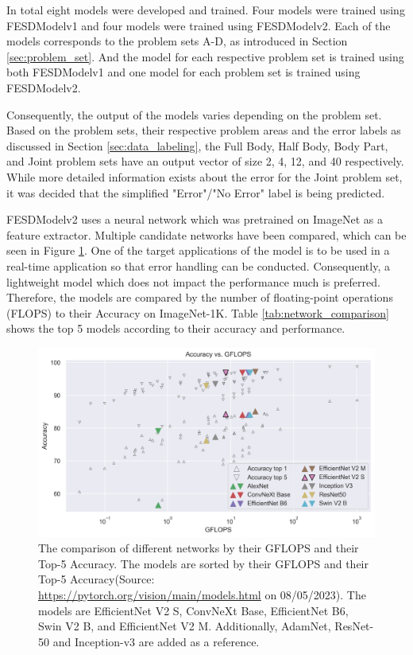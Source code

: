 In total eight models were developed and trained. Four models were trained using FESDModelv1 and four models were trained using FESDModelv2. Each of the models corresponds to the problem sets A-D, as introduced in Section \ref{sec:problem_set}. And the model for each respective problem set is trained using both FESDModelv1 and one model for each problem set is trained using FESDModelv2.

Consequently, the output of the models varies depending on the problem set. Based on the problem sets, their respective problem areas and the error labels as discussed in Section \ref{sec:data_labeling}, the Full Body, Half Body, Body Part, and Joint problem sets have an output vector of size 2, 4, 12, and 40 respectively. While more detailed information exists about the error for the Joint problem set, it was decided that the simplified "Error"/"No Error" label is being predicted.

FESDModelv2 uses a neural network which was pretrained on ImageNet as a feature extractor. Multiple candidate networks have been compared, which can be seen in Figure \ref{fig:network_comparison}. One of the target applications of the model is to be used in a real-time application so that error handling can be conducted. Consequently, a lightweight model which does not impact the performance much is preferred. Therefore, the models are compared by the number of floating-point operations (FLOPS) to their Accuracy on ImageNet-1K. Table \ref{tab:network_comparison} shows the top 5 models according to their accuracy and performance. 

\begin{figure}[htbp]
  \centering
  \includegraphics[width=.8\linewidth]{figures/network/networks.png}
  \caption[Network comparison]{The comparison of different networks by their GFLOPS and their Top-5 Accuracy. The models are sorted by their GFLOPS and their Top-5 Accuracy(Source: \url{https://pytorch.org/vision/main/models.html} on 08/05/2023). The models are EfficientNet V2 S, ConvNeXt Base, EfficientNet B6, Swin V2 B, and EfficientNet V2 M. Additionally, AdamNet, ResNet-50 and Inception-v3 are added as a reference.}
  \label{fig:network_comparison}
\end{figure}

